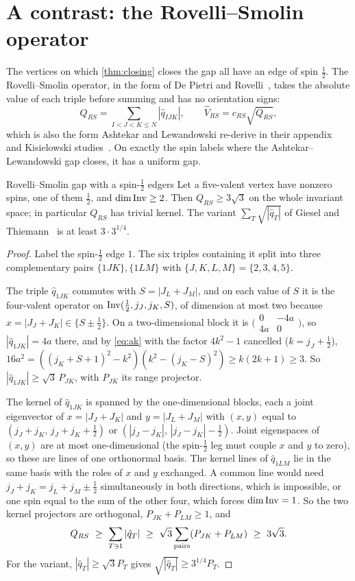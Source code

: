 \section{A contrast: the Rovelli--Smolin operator}\label{sec:rs}

The vertices on which \cref{thm:closing} closes the gap all have an edge of spin
$\frac12$. The Rovelli--Smolin operator, in the form of De Pietri and
Rovelli~\cite[eqs.~(7.15), (7.42)]{DPR1996}, takes the absolute value of each triple
before summing and has no orientation signs:
\[
  Q_{RS}=\sum_{I<J<K\le N}|\hat q_{IJK}|,\qquad \hat V_{RS}=c_{RS}\sqrt{Q_{RS}},
\]
which is also the form Ashtekar and Lewandowski re-derive in their
appendix~\cite{AL1998} and Kisielowski studies~\cite{Kis2021}. On exactly the spin labels
where the Ashtekar--Lewandowski gap closes, it has a uniform gap.

\begin{theorem}{Rovelli--Smolin gap with a spin-\texorpdfstring{$\frac12$}{1/2} edge}{rs}
Let a five-valent vertex have nonzero spins, one of them $\frac12$, and
$\dim\operatorname{Inv}\ge2$. Then $Q_{RS}\ge3\sqrt3$ on the whole invariant space; in particular
$Q_{RS}$ has trivial kernel. The variant $\sum_T\sqrt{|\hat q_T|}$ of Giesel and
Thiemann~\cite{GT2006} is at least $3\cdot3^{1/4}$.
\end{theorem}

\begin{proof}
Label the spin-$\frac12$ edge $1$. The six triples containing it split into three
complementary pairs $\{1JK\},\{1LM\}$ with $\{J,K,L,M\}=\{2,3,4,5\}$.

The triple $\hat q_{1JK}$ commutes with $S=|J_L+J_M|$, and on each value of $S$ it is the
four-valent operator on $\operatorname{Inv}(\frac12,j_J,j_K,S)$, of dimension at most two because
$x=|J_J+J_K|\in\{S\pm\frac12\}$. On a two-dimensional block it is
$\bigl(\begin{smallmatrix}0&-4a\\4a&0\end{smallmatrix}\bigr)$, so $|\hat q_{1JK}|=4a$ there,
and by \eqref{eq:ak} with the factor $4k^2-1$ cancelled ($k=j_J+\frac12$),
$16a^2=((j_K+S+1)^2-k^2)(k^2-(j_K-S)^2)\ge k(2k+1)\ge3$. So
$|\hat q_{1JK}|\ge\sqrt3\,P_{JK}$, with $P_{JK}$ its range projector.

The kernel of $\hat q_{1JK}$ is spanned by the one-dimensional blocks, each a joint
eigenvector of $x=|J_J+J_K|$ and $y=|J_L+J_M|$ with $(x,y)$ equal to
$(j_J+j_K,\,j_J+j_K+\frac12)$ or $(|j_J-j_K|,\,|j_J-j_K|-\frac12)$. Joint eigenspaces of
$(x,y)$ are at most one-dimensional (the spin-$\frac12$ leg must couple $x$ and $y$ to
zero), so these are lines of one orthonormal basis. The kernel lines of $\hat q_{1LM}$
lie in the same basis with the roles of $x$ and $y$ exchanged. A common line would need
$j_J+j_K=j_L+j_M\pm\frac12$ simultaneously in both directions, which is impossible, or
one spin equal to the sum of the other four, which forces $\dim\operatorname{Inv}=1$. So the two kernel
projectors are orthogonal, $P_{JK}+P_{LM}\ge1$, and
\[
  Q_{RS}\ \ge\ \sum_{T\ni1}|\hat q_T|\ \ge\ \sqrt3\sum_{\rm pairs}(P_{JK}+P_{LM})\ \ge\ 3\sqrt3 .
\]
For the variant, $|\hat q_T|\ge\sqrt3P_T$ gives $\sqrt{|\hat q_T|}\ge3^{1/4}P_T$.
\end{proof}

